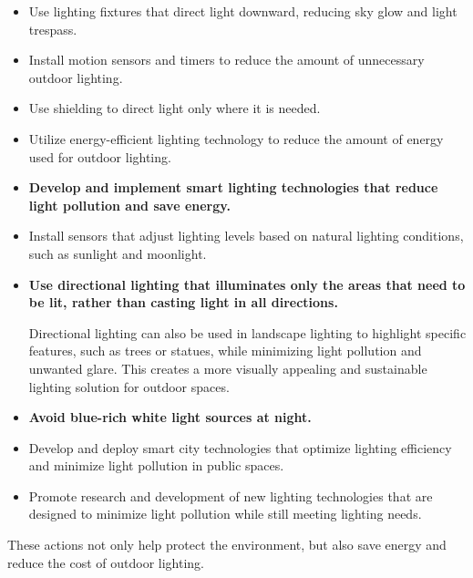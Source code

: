 \begin{itemize}
    \item Use lighting fixtures that direct light downward, reducing sky glow and light trespass.
    
    \item Install motion sensors and timers to reduce the amount of unnecessary outdoor lighting.
    
    \item Use shielding to direct light only where it is needed.
    
    \item Utilize energy-efficient lighting technology to reduce the amount of energy used for outdoor lighting.

    \item \textbf{Develop and implement smart lighting technologies that reduce light pollution and save energy.}
    
    \item Install sensors that adjust lighting levels based on natural lighting conditions, such as sunlight and moonlight.
    
    \item \textbf{Use directional lighting that illuminates only the areas that need to be lit, rather than casting light in all directions.}
    
    Directional lighting can also be used in landscape lighting to highlight specific features, such as trees or statues, while minimizing light pollution and unwanted glare. This creates a more visually appealing and sustainable lighting solution for outdoor spaces.
    
    \item \textbf{Avoid blue-rich white light sources at night. }
    
    \item Develop and deploy smart city technologies that optimize lighting efficiency and minimize light pollution in public spaces.
    
    \item Promote research and development of new lighting technologies that are designed to minimize light pollution while still meeting lighting needs.

    

\end{itemize}

These actions not only help protect the environment, but also save energy and reduce the cost of outdoor lighting.

